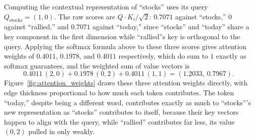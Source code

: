 \documentclass[../ai_in_finance]{subfiles}
\begin{document}
Computing the contextual representation of ``stocks'' uses its query $Q_{\text{stocks}} = (1,0)$. The raw scores are $Q \cdot K_i / \sqrt{2}$: $0.7071$ against ``stocks,'' $0$ against ``rallied,'' and $0.7071$ against ``today,'' since ``stocks'' and ``today'' share a key component in the first dimension while ``rallied''s key is orthogonal to the query. Applying the softmax formula above to these three scores gives attention weights of $0.4011$, $0.1978$, and $0.4011$ respectively, which do sum to $1$ exactly as softmax guarantees, and the weighted sum of value vectors is
\begin{equation*}
0.4011\,(2,0) + 0.1978\,(0,2) + 0.4011\,(1,1) = (1.2033,\ 0.7967).
\end{equation*}
Figure~\ref{fig:attention_weights} draws these three attention weights directly, with edge thickness proportional to how much each token contributes. The token ``today,'' despite being a different word, contributes exactly as much to ``stocks'''s new representation as ``stocks'' contributes to itself, because their key vectors happen to align with the query, while ``rallied'' contributes far less, its value $(0,2)$ pulled in only weakly.

\begin{figure}[htbp]
\centering
\begin{lrbox}{\bookmeasuredbox}
\end{lrbox}
\ifdim\wd\bookmeasuredbox<0.65\linewidth
\setlength{\bookcapwidth}{0.65\linewidth}
\else
\setlength{\bookcapwidth}{\wd\bookmeasuredbox}
\fi
{}
\end{figure}
\end{document}
